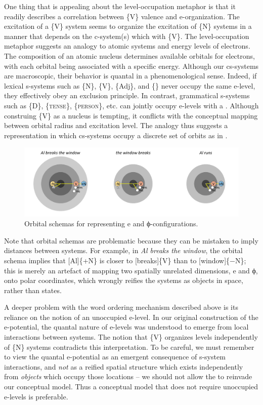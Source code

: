   One thing that is appealing about the level-occupation metaphor is that it readily describes a correlation between \{V\} valence and e-organization. The excitation of a \{V\} system seems to organize the excitation of \{N\} systems in a manner that depends on the c-system(s) which  with \{V\}. The level-occupation metaphor suggests an analogy to atomic systems and energy levels of electrons. The composition of an atomic nucleus determines available orbitals for electrons, with each orbital being associated with a specific energy. Although our cs-systems are macroscopic, their behavior is quantal in a phenomenological sense. Indeed, if lexical s-systems such as \{N\}, \{V\}, \{Adj\}, and \{\} never occupy the same e-level, they effectively obey an exclusion principle. In contrast, grammatical s-systems such as \{D\}, \{\textsc{tense}\}, \{\textsc{person}\}, etc. can jointly occupy e-levels with a . Although construing \{V\} as a nucleus is tempting, it conflicts with the conceptual mapping between orbital radius and excitation level. The analogy thus suggests a representation in which cs-systems occupy a discrete set of orbits as in {}.

  
\begin{figure}
\includegraphics[width=\textwidth]{figures/Tilsen-img76.png}
\caption{Orbital schemas for representing e and ϕ-configurations.}
\label{fig:4:26}
\end{figure}
 

  Note that orbital schemas are problematic because they can be mistaken to imply distances between systems. For example, in \textit{Al breaks the window}, the orbital schema implies that [Al]\{+N\} is closer to [breaks]\{V\} than to [window]\{−N\}; this is merely an artefact of mapping two spatially unrelated dimensions, e and ϕ, onto polar coordinates, which wrongly reifies the systems as objects in space, rather than states.

  A deeper problem with the word ordering mechanism described above is its reliance on the notion of an unoccupied e-level. In our original construction of the e-potential, the quantal nature of e-levels was understood to emerge from local interactions between systems. The notion that \{V\} organizes levels independently of \{N\} systems contradicts this interpretation. To be careful, we must remember to view the quantal e-potential as an emergent consequence of s-system interactions, and \textit{not} as a reified spatial structure which exists independently from \textit{objects} which occupy those locations -- we should not allow the  to reinvade our conceptual model. Thus a conceptual model that does not require unoccupied e-levels is preferable.

